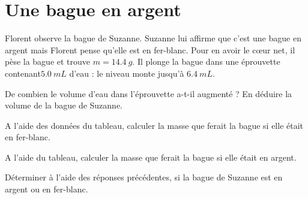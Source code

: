 \section{Une bague en argent}\label{ex:bague}

Florent observe la bague de Suzanne. Suzanne lui affirme que c'est une bague en argent mais Florent pense qu'elle est en fer-blanc. Pour en avoir le c\oe ur net, il pèse la bague et trouve $m = \num{14.4} \ g$. Il plonge la bague dans une éprouvette contenant$ \num{5.0} \ mL$ d'eau : le niveau monte jusqu'à $\num{6.4} \ mL$.  

\begin{questions}
	\question De combien le volume d'eau dans l'éprouvette a-t-il augmenté ? En déduire la volume de la bague de Suzanne.
	
	\question A l'aide des données du tableau, calculer la masse que ferait la bague si elle était en fer-blanc.
	
	\question A l'aide du tableau, calculer la masse que ferait la bague si elle était en argent.
	
	\question Déterminer à l'aide des réponses précédentes, si la bague de Suzanne est en argent ou en fer-blanc.

\end{questions}
